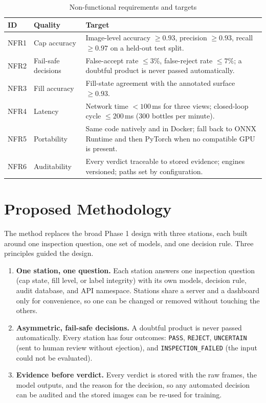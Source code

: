 \begin{table}[htbp]
\centering
\caption{Non-functional requirements and targets}
\label{tab:nfr}
\begin{tabularx}{\textwidth}{|L{1.2cm}|L{3.0cm}|X|}
\hline
\textbf{ID} & \textbf{Quality} & \textbf{Target} \\ \hline
NFR1 & Cap accuracy & Image-level accuracy $\geq0.93$, precision $\geq0.93$, recall $\geq0.97$ on a held-out test split. \\ \hline
NFR2 & Fail-safe decisions & False-accept rate $\leq3\%$, false-reject rate $\leq7\%$; a doubtful product is never passed automatically. \\ \hline
NFR3 & Fill accuracy & Fill-state agreement with the annotated surface $\geq0.93$. \\ \hline
NFR4 & Latency & Network time $<100$\,ms for three views; closed-loop cycle $\leq200$\,ms (300 bottles per minute). \\ \hline
NFR5 & Portability & Same code natively and in Docker; fall back to ONNX Runtime and then PyTorch when no compatible GPU is present. \\ \hline
NFR6 & Auditability & Every verdict traceable to stored evidence; engines versioned; paths set by configuration. \\ \hline
\end{tabularx}
\end{table}

\section{Proposed Methodology}
\label{sec:proposed-method}

The method replaces the broad Phase 1 design with three stations, each built around one inspection question, one set of models, and one decision rule. Three principles guided the design.
\begin{enumerate}
    \item \textbf{One station, one question.} Each station answers one inspection question (cap state, fill level, or label integrity) with its own models, decision rule, audit database, and API namespace. Stations share a server and a dashboard only for convenience, so one can be changed or removed without touching the others.
    \item \textbf{Asymmetric, fail-safe decisions.} A doubtful product is never passed automatically. Every station has four outcomes: \texttt{PASS}, \texttt{REJECT}, \texttt{UNCERTAIN} (sent to human review without ejection), and \texttt{INSPECTION\_FAILED} (the input could not be evaluated).
    \item \textbf{Evidence before verdict.} Every verdict is stored with the raw frames, the model outputs, and the reason for the decision, so any automated decision can be audited and the stored images can be re-used for training.
\end{enumerate}

